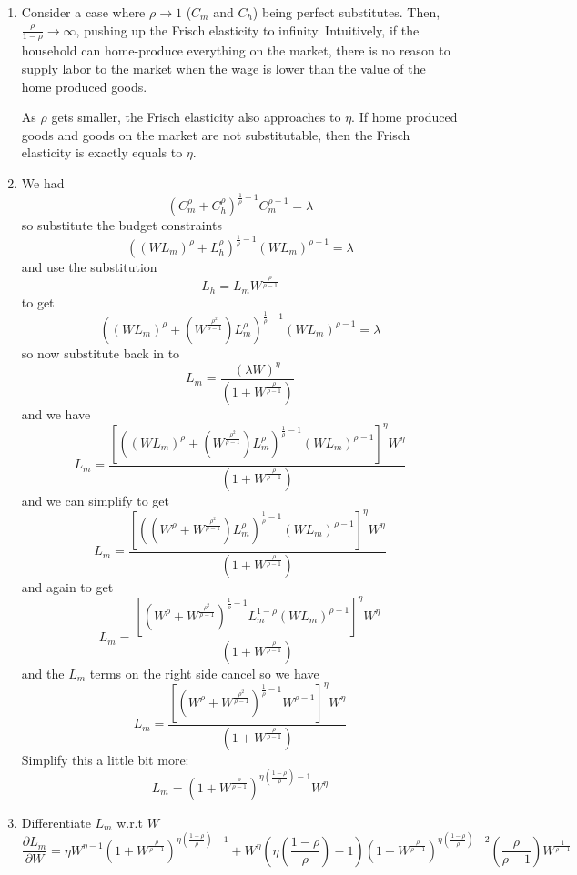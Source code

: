 \documentclass[11pt]{amsart}
\begin{document}
\begin{enumerate}[label = (\alph*)]
	\item Consider a case where $\rho \rightarrow 1$ ($C_m$ and $C_h$) being perfect substitutes. Then, $\frac{\rho}{1 - \rho} \rightarrow \infty$, pushing up the Frisch elasticity to infinity. Intuitively, if the household can home-produce everything on the market, there is no reason to supply labor to the market when the wage is lower than the value of the home produced goods. 
	
	As $\rho$ gets smaller, the Frisch elasticity also approaches to $\eta$. If home produced goods and goods on the market are not substitutable, then the Frisch elasticity is exactly equals to $\eta$. 
	\item
	We had
	\[
	\left( C_m^\rho + C_h^\rho \right)^{\frac{1}{\rho} -1}  C_m^{\rho-1} = \lambda
	\]
	so substitute the budget constraints
	\[
	((W L_m)^{\rho} + L_h^{\rho})^{\frac{1}{\rho} -1} (W L_m)^{\rho-1} = \lambda
	\]
	and use the substitution
	\[
	L_h = L_m W^{\frac{\rho}{\rho-1}}
	\]
	to get
	\[
	((W L_m)^{\rho} + ( W^{\frac{\rho^2}{\rho-1}}) L_m^{\rho})^{\frac{1}{\rho} -1} (W L_m)^{\rho-1} = \lambda
	\]
	so now substitute back in to
	\[
	L_m = \frac{(\lambda W)^{\eta}}{(1 + W^{\frac{\rho}{\rho-1}})}
	\]
	and we have
	\[
	L_m = \frac{ \left[((W L_m)^{\rho} + ( W^{\frac{\rho^2}{\rho-1}}) L_m^{\rho})^{\frac{1}{\rho} -1} (W L_m)^{\rho-1}\right]^{\eta} W^{\eta}}{(1 + W^{\frac{\rho}{\rho-1}})}
	\]
	and we can simplify to get
	\[
	L_m = \frac{ \left[((W^{\rho} + W^{\frac{\rho^2}{\rho-1}}) L_m^{\rho})^{\frac{1}{\rho} -1} (W L_m)^{\rho-1}\right]^{\eta} W^{\eta}}{(1 + W^{\frac{\rho}{\rho-1}})}
	\]
	and again to get
	\[
	L_m = \frac{ \left[(W^{\rho} + W^{\frac{\rho^2}{\rho-1}})^{\frac{1}{\rho} -1} L_m^{1-\rho} (W L_m)^{\rho-1}\right]^{\eta} W^{\eta}}{(1 + W^{\frac{\rho}{\rho-1}})}
	\]
	and the $L_m$ terms on the right side cancel so we have
	\[
	L_m = \frac{ \left[(W^{\rho} + W^{\frac{\rho^2}{\rho-1}})^{\frac{1}{\rho} -1}  W ^{\rho-1}\right]^{\eta} W^{\eta}}{(1 + W^{\frac{\rho}{\rho-1}})}
	\]
	Simplify this a little bit more:
	\begin{equation*}
	L_m = \left( 1 + W^{\frac{\rho}{\rho-1}} \right)^{\eta \left( \frac{1-\rho}{\rho} \right) -1} W^\eta
	\end{equation*}
	\item Differentiate $L_m$ w.r.t $W$
	\begin{equation*}
	\frac{\partial L_m}{\partial W} = \eta W^{\eta -1 } \left( 1 + W^{\frac{\rho}{\rho-1}} \right)^{\eta \left( \frac{1-\rho}{\rho} \right) -1} + W^\eta \left( \eta \left( \frac{1-\rho}{\rho} \right) -1  \right)  \left( 1 + W^{\frac{\rho}{\rho-1}} \right)^{\eta \left( \frac{1-\rho}{\rho} \right) -2} \left( \frac{\rho}{\rho-1} \right) W^{\frac{1}{\rho-1}}

\end{equation*}
\end{enumerate}
\end{document}
